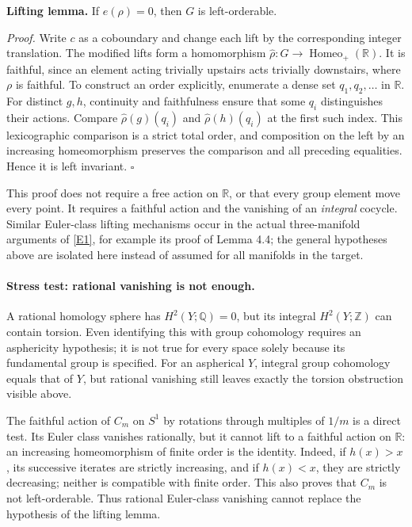 \documentclass[11pt,a4paper]{article}
\newcommand{\Z}{\mathbb{Z}}
\newcommand{\Q}{\mathbb{Q}}
\newcommand{\R}{\mathbb{R}}
\newcommand{\eref}[2]{\hyperlink{extra:#1:#2}{[E#2]}}
\numberwithin{equation}{section}
\begin{document}
\textbf{Lifting lemma.} If $e(\rho)=0$, then $G$ is left-orderable.

\textit{Proof.} Write $c$ as a coboundary and change each lift by the
corresponding integer translation. The modified lifts form a homomorphism
$\widehat\rho:G\to\operatorname{Homeo}_+(\R)$. It is faithful, since an
element acting trivially upstairs acts trivially downstairs, where $\rho$
is faithful. To construct an order explicitly, enumerate a dense set
$q_1,q_2,\ldots$ in $\R$. For distinct $g,h$, continuity and faithfulness
ensure that some $q_i$ distinguishes their actions. Compare
$\widehat\rho(g)(q_i)$ and $\widehat\rho(h)(q_i)$ at the first such index.
This lexicographic comparison is a strict total order, and composition on
the left by an increasing homeomorphism preserves the comparison and all
preceding equalities. Hence it is left invariant. \hfill$\square$

This proof does not require a free action on $\R$, or that every group
element move every point. It requires a faithful action and the vanishing
of an \emph{integral} cocycle. Similar Euler-class lifting mechanisms
occur in the actual three-manifold arguments of \eref{181}{1}, for example
its proof of Lemma 4.4; the general hypotheses above are isolated here
instead of assumed for all manifolds in the target.

\paragraph{Stress test: rational vanishing is not enough.}
A rational homology sphere has $H^2(Y;\Q)=0$, but its integral
$H^2(Y;\Z)$ can contain torsion. Even identifying this with group
cohomology requires an asphericity hypothesis; it is not true for every
space solely because its fundamental group is specified. For an
aspherical $Y$, integral group cohomology equals that of $Y$, but rational
vanishing still leaves exactly the torsion obstruction visible above.

The faithful action of $C_m$ on $S^1$ by rotations through multiples of
$1/m$ is a direct test. Its Euler class vanishes rationally, but it cannot
lift to a faithful action on $\R$: an increasing homeomorphism of finite
order is the identity. Indeed, if $h(x)>x$, its successive iterates are
strictly increasing, and if $h(x)<x$, they are strictly decreasing; neither
is compatible with finite order. This also proves that $C_m$ is not
left-orderable. Thus rational Euler-class vanishing cannot replace the
hypothesis of the lifting lemma.
\end{document}
